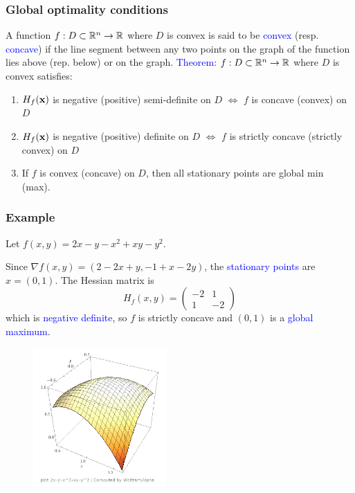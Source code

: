 \documentclass[11pt,aspectratio=169]{beamer}
\begin{document}
\begin{frame}
\frametitle{Global optimality conditions}
\begin{small}
A function $f:D \subset \mathbb R^n \rightarrow \mathbb R$ where $D$ is convex is said to be \textcolor{blue}{convex} (resp. \textcolor{blue}{concave}) if the line segment between any two points on the graph of the function lies above (rep. below) or on the graph.
\vskip 12pt
\textcolor{blue}{Theorem:} $f:D \subset \mathbb R^n \rightarrow \mathbb R$ where $D$ is convex satisfies:
\begin{enumerate}
\item $H_f({\bf x})$ is negative (positive) semi-definite on $D$ $\Leftrightarrow$ $f$ is concave (convex) on $D$
\item $H_f({\bf x})$ is negative (positive) definite on $D$ $\Leftrightarrow$ $f$ is strictly concave (strictly convex) on $D$

\item  If $f$ is convex (concave) on $D$, then all stationary points are global min (max).
\end{enumerate}


\end{small}
\end{frame}



\begin{frame}
\frametitle{Example}
\begin{small}
Let $f(x,y)=2x-y-x^2+xy-y^2$. 
\vskip 8pt
\begin{tiny}Since $\nabla f(x,y)=(2-2x+y, -1+x-2y)$, the \textcolor{blue}{stationary points} are $x=(0,1)$. The Hessian matrix is
\begin{equation*}
H_f(x,y)=\begin{pmatrix}
-2 & 1 \\
1 & -2
\end{pmatrix}
\end{equation*}
which is \textcolor{blue}{negative definite}, so $f$ is strictly concave and $(0,1)$ is a \textcolor{blue}{global maximum}.\end{tiny}
\end{small}
\begin{figure}
\includegraphics[width=2in]{img/plotxy} 
\end{figure}
\end{frame}
\end{document}
